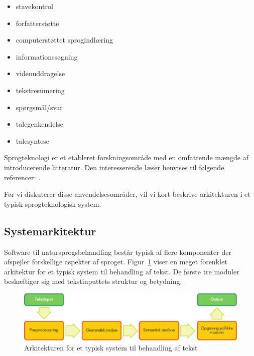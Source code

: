 \begin{multicols}{2}
\begin{itemize}
      \item stavekontrol
      \item forfatterst\o tte
      \item computerst\o ttet sprogindl\ae ring
      \item informationss\o gning
      \item videnuddragelse
      \item tekstresumering
      \item sp\o rgsm\aa l/svar
      \item talegenkendelse
      \item talesyntese
    \end{itemize}
    \sloppy
Sprogteknologi er et etableret forskningsomr\aa de med en omfattende m\ae ngde af introducerende litteratur. Den interesserende l\ae ser henvises til f\o lgende refe\-rencer:  \cite{Braasch, jurafsky-martin01, manning-schuetze1, lt-world1, lt-survey1}.   


 F\o r vi diskuterer disse anvendelses\-omr\aa der, vil vi kort beskrive arkitekturen i et typisk sprogteknologisk system.


\subsection{Systemarkitektur}

 Software til natursprogsbehandling best\aa r typisk af flere komponenter der afspejler forskellige aspekter af sproget.  Figur~\ref{fig:textprocessingarch_de} viser en meget forenklet arkitektur for et typisk system til behandling af tekst. De f\o rste tre mo\-duler besk\ae ftiger sig med tekstinputtets struktur og betydning:

\begin{figure}[hb]
  \center
  \includegraphics[width=\textwidth]{../_media/danish/text_processing_app_architecture}
  \caption{Arkitekturen for et typisk system til behandling af tekst}
  \label{fig:textprocessingarch_de}
\end{figure}


\end{multicols}
